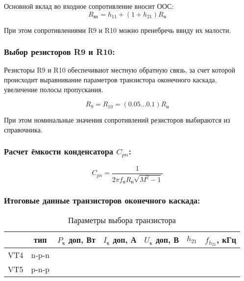 Основной вклад во входное сопротивление вносит ООС:
\begin{equation}
\label{eq:equation2_20}
 R_{\text{вх}} = h_{11} + (1 + h_{21} ) R_{\text{н}}
\end{equation}

При этом сопротивлениями R9 и R10  можно пренебречь ввиду их малости.
\begin{equation*}
  
\end{equation*}

\subsubsection{Выбор резисторов R9 и R10:}
Резисторы R9 и R10 обеспечивают местную обратную связь, за счет которой происходит выравнивание параметров транзистора оконечного каскада, увеличение полосы пропускания.

\begin{equation}
\label{eq:equation2_21}
 R_{\text{9}} = R_{\text{10}} = (0.05 \ldots 0.1) R_{\text{н}}
\end{equation}
\begin{equation*}
  
\end{equation*}

При этом номинальные значения сопротивлений резисторов выбираются из справочника.

\subsubsection{Расчет ёмкости конденсатора $C_{pn}$:}

\begin{equation}
\label{eq:equation2_22}
 C_{pn} = \dfrac{1}{2 \pi f_{\text{н}} R_{\text{н}} \sqrt{M^2 - 1} }
\end{equation}
\begin{equation*}
  
\end{equation*}

\subsubsection{Итоговые данные транзисторов оконечного каскада:}

\begin{table}[htbp]
\caption{Параметры выбора транзистора }
\begin{center}\begin{tabular}{|c|c|c|c|c|c|c|}
\hline 
  & тип & $P_{\text{к}}$ доп, Вт & $I_{\text{к}}$ доп, А & $U_{\text{к}}$ доп, В & $h_{21}$ &  $f_{h_{21}}$, кГц \\ 
\hline 
VT4 & n-p-n &   &  &  &  & \\ 
\hline 
VT5 & p-n-p &   &  &  &  &  \\ 
\hline 
\end{tabular} 
\end{center}
\end{table}

